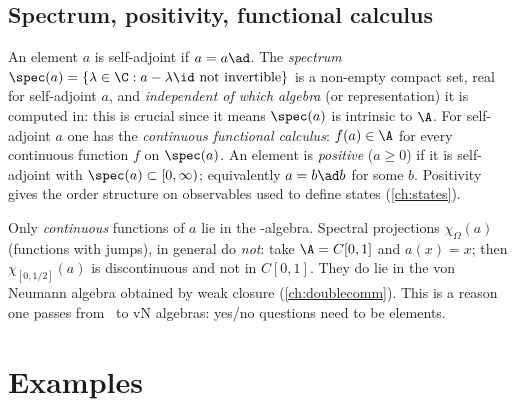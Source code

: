 \subsection*{Spectrum, positivity, functional calculus}
An element $a$ is self-adjoint if $a=a\ad$. The \emph{spectrum} $\spec(a)=\{\lambda\in\C:a-\lambda\id\text{ not invertible}\}$ is a non-empty compact set, real for self-adjoint $a$, and \emph{independent of which algebra} (or representation) it is computed in: this is crucial since it means $\spec(a)$ is intrinsic to $\A$. For self-adjoint $a$ one has the \emph{continuous functional calculus}: $f(a)\in\A$ for every continuous function $f$ on $\spec(a)$. An element is \emph{positive} ($a\ge0$) if it is self-adjoint with $\spec(a)\subset[0,\infty)$; equivalently $a=b\ad b$ for some $b$. Positivity gives the order structure on observables used to define states (\cref{ch:states}).

\begin{whatwrong}
Only \emph{continuous} functions of $a$ lie in the \cstar-algebra. Spectral projections $\chi_\Omega(a)$ (functions with jumps), in general do \emph{not}: take $\A=C[0,1]$ and $a(x)=x$; then $\chi_{[0,1/2]}(a)$ is discontinuous and not in $C[0,1]$. They do lie in the von Neumann algebra obtained by weak closure (\cref{ch:doublecomm}). This is a reason one passes from \cstar\ to vN algebras: yes/no questions need to be elements.
\end{whatwrong}

\section{Examples}

